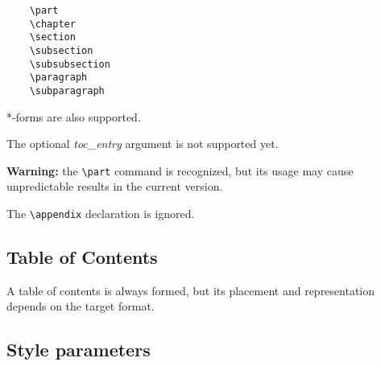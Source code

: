 \verb'    \part'          \\
\verb'    \chapter'       \\
\verb'    \section'       \\
\verb'    \subsection'    \\
\verb'    \subsubsection' \\
\verb'    \paragraph'     \\
\verb'    \subparagraph'

*-forms are also supported.

The optional {\it toc\_entry} argument is not supported yet.

{\bf Warning:} the \verb'\part' command is recognized, but its usage may
cause unpredictable results in the current version.

The \verb'\appendix' declaration is ignored.

\subsection{Table of Contents}

A table of contents is always formed, but its placement and representation
depends on the target format. %

\subsection{Style parameters}

